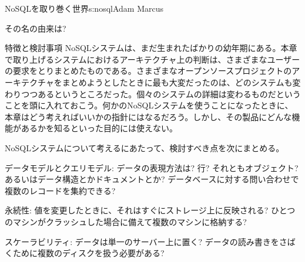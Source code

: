 \begin{aosachapter}{NoSQLを取り巻く世界}{s:nosql}{Adam Marcus}
\begin{aosasect1}{その名の由来は?}
\begin{aosasect2}{特徴と検討事項}
NoSQLシステムは、まだ生まれたばかりの幼年期にある。本章で取り上げるシステムにおけるアーキテクチャ上の判断は、さまざまなユーザーの要求をとりまとめたものである。さまざまなオープンソースプロジェクトのアーキテクチャをまとめようとしたときに最も大変だったのは、どのシステムも変わりつつあるというところだった。個々のシステムの詳細は変わるものだということを頭に入れておこう。何かのNoSQLシステムを使うことになったときに、本章はどう考えればいいかの指針にはなるだろう。しかし、その製品にどんな機能があるかを知るといった目的には使えない。

\pagebreak

\noindent NoSQLシステムについて考えるにあたって、検討すべき点を次にまとめる。

\begin{aosadescription}

  \item{データモデルとクエリモデル}: データの表現方法は? 行? それともオブジェクト? あるいはデータ構造とかドキュメントとか? データベースに対する問い合わせで複数のレコードを集約できる?

  \item{永続性}: 値を変更したときに、それはすぐにストレージ上に反映される? ひとつのマシンがクラッシュした場合に備えて複数のマシンに格納する?

  \item{スケーラビリティ}: データは単一のサーバー上に置く? データの読み書きをさばくために複数のディスクを扱う必要がある?


\end{aosadescription}
\end{aosasect2}
\end{aosasect1}
\end{aosachapter}
